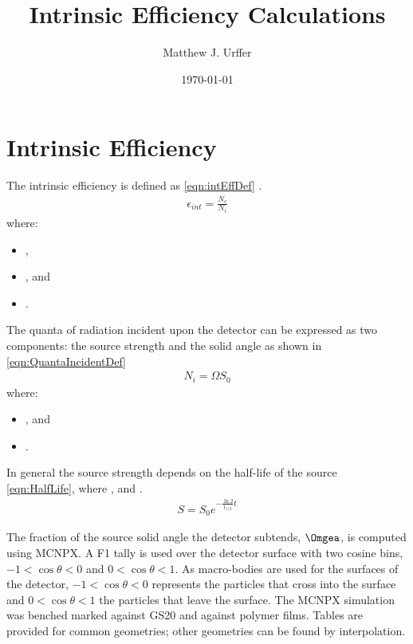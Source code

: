\documentclass[draftcls,onecolumn]{IEEEtran}
\begin{document}
\title{Intrinsic Efficiency Calculations}
\author{Matthew J. Urffer}
\date{\today}
\maketitle

\printnomenclature
\printindex

\listoftodos
\tableofcontents
\listoffigures
\listoftables
\lstlistoflistings
\section{Intrinsic Efficiency}
The intrinsic efficiency is defined as \eqref{eqn:intEffDef} \cite{knoll_radiation_2009}.
\begin{align}
  \label{eqn:intEffDef}
  \epsilon_{int} = \frac{N_c}{N_i}
\end{align}
where:
\begin{itemize}
  \item[] ,
  \item[] , and
  \item[] .
\end{itemize}
The quanta of radiation incident upon the detector can be expressed as two components: the source strength and the solid angle as shown in \eqref{eqn:QuantaIncidentDef}
\begin{align}
  \label{eqn:QuantaIncidentDef}
  N_i = \Omega S_0
\end{align}
where:
\begin{itemize}
  \item[] , and 
  \item[] .
\end{itemize}
In general the source strength depends on the half-life of the source \eqref{eqn:HalfLife}, where ,  and .
\begin{align}
  \label{eqn:HalfLife}
  S = S_0 e^{-\frac{\ln{2}}{t_{1/2}} t}
\end{align}

The fraction of the source solid angle the detector subtends, $\Omgea$, is computed using MCNPX. 
A F1 tally is used over the detector surface with two cosine bins, $-1<\cos\theta<0$ and $0<\cos\theta<1$.
As macro-bodies are used for the surfaces of the detector, $-1<\cos\theta<0$ represents the particles that cross into the surface and $0<\cos\theta<1$ the particles that leave the surface.
The MCNPX simulation was benched marked against GS20 and against polymer films.
Tables are provided for common geometries; other geometries can be found by interpolation.
\end{document}
